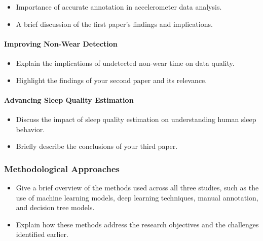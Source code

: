 \documentclass[
  8pt,
  letterpaper,
  DIV=11,
  numbers=noendperiod]{scrartcl}
\let\oldparagraph\paragraph
\renewcommand{\paragraph}[1]{\oldparagraph{#1}\mbox{}}
\providecommand{\tightlist}{%
  \setlength{\itemsep}{0pt}\setlength{\parskip}{0pt}}\usepackage{longtable,booktabs,array}
\begin{document}
\begin{itemize}
\tightlist
\item
  Importance of accurate annotation in accelerometer data analysis.
\item
  A brief discussion of the first paper's findings and implications.
\end{itemize}

\hypertarget{improving-non-wear-detection}{%
\paragraph{Improving Non-Wear
Detection}\label{improving-non-wear-detection}}

\begin{itemize}
\tightlist
\item
  Explain the implications of undetected non-wear time on data quality.
\item
  Highlight the findings of your second paper and its relevance.
\end{itemize}

\hypertarget{advancing-sleep-quality-estimation}{%
\paragraph{Advancing Sleep Quality
Estimation}\label{advancing-sleep-quality-estimation}}

\begin{itemize}
\tightlist
\item
  Discuss the impact of sleep quality estimation on understanding human
  sleep behavior.
\item
  Briefly describe the conclusions of your third paper.
\end{itemize}

\hypertarget{methodological-approaches}{%
\subsubsection{Methodological
Approaches}\label{methodological-approaches}}

\begin{itemize}
\item
  Give a brief overview of the methods used across all three studies,
  such as the use of machine learning models, deep learning techniques,
  manual annotation, and decision tree models.
\item
  Explain how these methods address the research objectives and the
  challenges identified earlier.
\end{itemize}
\end{document}
